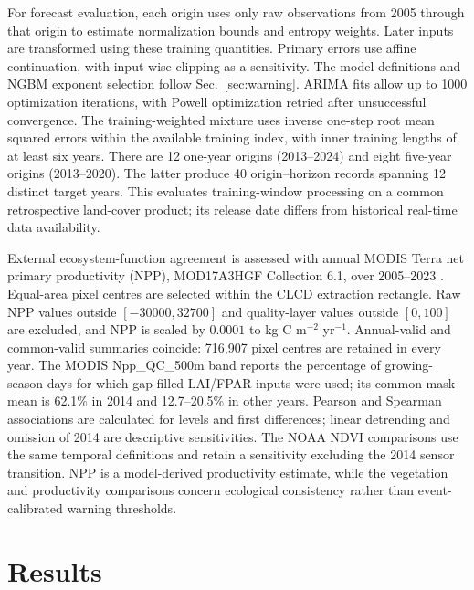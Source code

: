 \documentclass[preprint,11pt,authoryear]{elsarticle}
\begin{document}
For forecast evaluation, each origin uses only raw observations from 2005 through that origin to estimate normalization bounds and entropy weights. Later inputs are transformed using these training quantities. Primary errors use affine continuation, with input-wise clipping as a sensitivity. The model definitions and NGBM exponent selection follow Sec.~\ref{sec:warning}. ARIMA fits allow up to 1000 optimization iterations, with Powell optimization retried after unsuccessful convergence. The training-weighted mixture uses inverse one-step root mean squared errors within the available training index, with inner training lengths of at least six years. There are 12 one-year origins (2013--2024) and eight five-year origins (2013--2020). The latter produce 40 origin--horizon records spanning 12 distinct target years. This evaluates training-window processing on a common retrospective land-cover product; its release date differs from historical real-time data availability.

External ecosystem-function agreement is assessed with annual MODIS Terra net primary productivity (NPP), MOD17A3HGF Collection 6.1, over 2005--2023 \citep{running2021npp}. Equal-area pixel centres are selected within the CLCD extraction rectangle. Raw NPP values outside $[-30000,32700]$ and quality-layer values outside $[0,100]$ are excluded, and NPP is scaled by $0.0001$ to kg C m$^{-2}$ yr$^{-1}$. Annual-valid and common-valid summaries coincide: 716,907 pixel centres are retained in every year. The MODIS Npp_QC_500m band reports the percentage of growing-season days for which gap-filled LAI/FPAR inputs were used; its common-mask mean is 62.1\% in 2014 and 12.7--20.5\% in other years. Pearson and Spearman associations are calculated for levels and first differences; linear detrending and omission of 2014 are descriptive sensitivities. The NOAA NDVI comparisons use the same temporal definitions and retain a sensitivity excluding the 2014 sensor transition. NPP is a model-derived productivity estimate, while the vegetation and productivity comparisons concern ecological consistency rather than event-calibrated warning thresholds.

\section{Results}
\label{sec:results}
\end{document}
